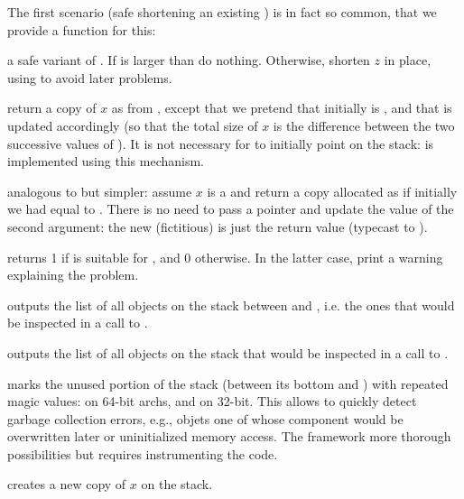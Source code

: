 The first scenario (safe shortening an existing ) is in fact so
common, that we provide a function for this:

 a safe variant of . If
 is larger than  do nothing. Otherwise, shorten $z$ in
place, using  to avoid later  problems.

 return a copy of $x$ as from
, except that we pretend that initially  is ,
and that  is updated accordingly (so that the total size of $x$ is
the difference between the two successive values of ). It is not
necessary for  to initially point on the stack:  is
implemented using this mechanism.

 analogous to  but
simpler: assume $x$ is a  and return a copy allocated as if
initially we had  equal to . There is no need to pass a
pointer and update the value of the second argument: the new (fictitious)
 is just the return value (typecast to ).


 returns 1 if  is suitable for
, and 0 otherwise. In the latter case, print a warning
explaining the problem.

 outputs the list of all objects on the
stack between  and , i.e. the ones that would be inspected
in a call to .

 outputs the list of all objects on the
stack that would be inspected in a call to .

 marks the unused portion of the stack
(between its bottom and ) with repeated magic values:
 on 64-bit archs, and  on 32-bit.
This allows to quickly detect garbage collection errors, e.g., objets one of
whose component would be overwritten later or uninitialized memory access.
The  framework more thorough possibilities but requires
instrumenting the code.


 creates a new copy of $x$ on the stack.

